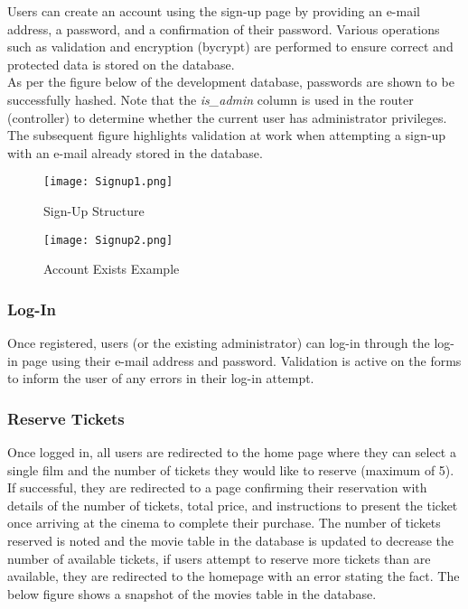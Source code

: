 \documentclass[11pt, english]{article}
\begin{document}
	Users can create an account using the sign-up page by providing an e-mail address, a password, and a confirmation of their password. Various operations such as validation and encryption (bycrypt) are performed to ensure correct and protected data is stored on the database.\\

	As per the figure below of the development database, passwords are shown to be successfully hashed. Note that the \textit{is\_admin} column is used in the router (controller) to determine whether the current user has administrator privileges. The subsequent figure highlights validation at work when attempting a sign-up with an e-mail already stored in the database.

	\begin{figure}[H]
	\begin{center}
		\texttt{[image: Signup1.png]}
		\caption{Sign-Up Structure}
	\end{center}
	\end{figure}

	\begin{figure}[H]
	\begin{center}
		\texttt{[image: Signup2.png]}
		\caption{Account Exists Example}
	\end{center}
	\end{figure}

		\subsubsection{Log-In}

	Once registered, users (or the existing administrator) can log-in through the log-in page using their e-mail address and password. Validation is active on the forms to inform the user of any errors in their log-in attempt.

		\subsubsection{Reserve Tickets}

	Once logged in, all users are redirected to the home page where they can select a single film and the number of tickets they would like to reserve (maximum of 5). If successful, they are redirected to a page confirming their reservation with details of the number of tickets, total price, and instructions to present the ticket once arriving at the cinema to complete their purchase. The number of tickets reserved is noted and the movie table in the database is updated to decrease the number of available tickets, if users attempt to reserve more tickets than are available, they are redirected to the homepage with an error stating the fact. The below figure shows a snapshot of the movies table in the database.
\end{document}
